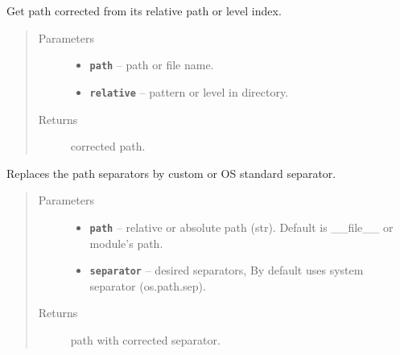 \documentclass[letterpaper,10pt,english]{sphinxmanual}
\begin{document}
\begin{fulllineitems}
\label{RRtoolbox.lib:RRtoolbox.lib.directory.correctPath}
Get path corrected from its relative path or level index.
\begin{quote}\begin{description}
\item[{Parameters}] \leavevmode\begin{itemize}
\item {} 
\textbf{\texttt{path}} -- path or file name.

\item {} 
\textbf{\texttt{relative}} -- pattern or level in directory.

\end{itemize}

\item[{Returns}] \leavevmode
corrected path.

\end{description}\end{quote}

\end{fulllineitems}


\begin{fulllineitems}
\label{RRtoolbox.lib:RRtoolbox.lib.directory.correctSep}
Replaces the path separators by custom or OS standard separator.
\begin{quote}\begin{description}
\item[{Parameters}] \leavevmode\begin{itemize}
\item {} 
\textbf{\texttt{path}} -- relative or absolute path (str). Default is \_\_file\_\_ or module's path.

\item {} 
\textbf{\texttt{separator}} -- desired separators, By default uses system separator (os.path.sep).

\end{itemize}

\item[{Returns}] \leavevmode
path with corrected separator.

\end{description}\end{quote}

\end{fulllineitems}
\end{document}
